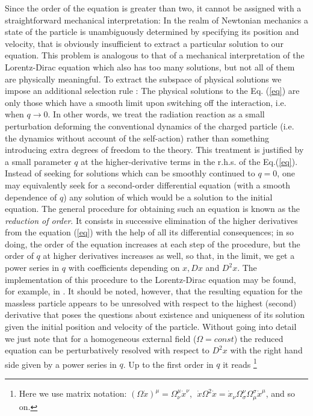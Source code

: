\documentclass[a4paper,12pt]{article}
\begin{document}
Since the order of the equation is greater than two, it cannot be
assigned with a straightforward mechanical interpretation: In the
realm of Newtonian mechanics a state of the particle is
unambiguously determined by specifying  its position and
velocity, that is obviously insufficient to extract a particular
solution to our equation. This problem is analogous to that of a
mechanical interpretation of the Lorentz-Dirac equation which also
has too many solutions, but not all of them are physically
meaningful. To extract the subspace of physical solutions we
impose an additional selection rule \cite{Bh}: The physical
solutions to the Eq. (\ref{eq}) are only those which have a
smooth limit upon switching off the interaction, i.e. when $q
\rightarrow 0 $. In other words, we treat the radiation reaction
as a small perturbation deforming the conventional dynamics of
the charged particle (i.e. the dynamics without account of the
self-action) rather than something introducing extra degrees of
freedom to the theory. This treatment is justified by a small
parameter $q$ at the higher-derivative terms in the r.h.s. of the
Eq.(\ref{eq}). Instead of seeking for solutions which can be
smoothly continued to $q=0$, one may equivalently seek for a
second-order differential equation (with a  smooth dependence of
$q$) any solution of which would be a solution to the initial
equation. The general procedure for obtaining such an equation is
known as the \textit{reduction of order}. It consists in
successive elimination of the higher derivatives from the
equation (\ref{eq}) with the help of all its differential
consequences; in so doing, the order of the equation increases at
each step of the procedure, but the order of $q$ at higher
derivatives increases as well, so that, in the limit, we get a
power series in $q$ with coefficients depending on $x, Dx$ and
$D^2x$. The implementation of this procedure to the Lorentz-Dirac
equation may be found, for example, in \cite{LL, Poisson, M}. It
should be noted, however, that the resulting equation for the
massless particle appears to be unresolved with respect to the
highest (second) derivative that poses the questions about
existence and uniqueness of its solution given the initial
position and velocity of the particle. Without going into detail
we just note that for a homogeneous external field
($\Omega=const$) the reduced equation can be perturbatively
resolved with respect to $D^2x$ with the right hand side given by
a power series in $q$. Up to the first order in $q$ it reads
\footnote{Here we use matrix notation: $(\Omega\dot
x)^\mu=\Omega^\mu_{\nu}\dot x^\nu$, $\;\dot x\Omega^2\dot x=\dot
x_\nu \Omega ^\nu_\sigma \Omega^\sigma_\mu \dot x^\mu$, and so
on.}
\end{document}
